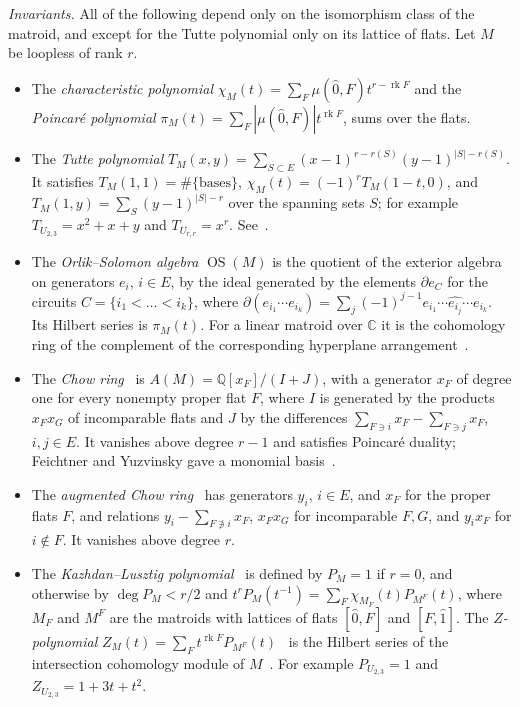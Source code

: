 \documentclass[11pt,a4paper]{article}
\numberwithin{equation}{section}
\theoremstyle{plain}
\theoremstyle{definition}
\theoremstyle{remark}
\newcommand{\Q}{\mathbb{Q}}
\newcommand{\C}{\mathbb{C}}
\DeclareMathOperator{\rk}{rk}
\DeclareMathOperator{\OS}{OS}
\begin{document}
\emph{Invariants.} All of the following depend only on the isomorphism class of the matroid, and except for the Tutte polynomial only on its lattice of flats. Let $M$ be loopless of rank $r$.
\begin{itemize}[leftmargin=1.5em]
\item The \emph{characteristic polynomial} $\chi_M(t)=\sum_F\mu(\hat0,F)t^{r-\rk F}$ and the \emph{Poincaré polynomial} $\pi_M(t)=\sum_F|\mu(\hat0,F)|t^{\rk F}$, sums over the flats.
\item The \emph{Tutte polynomial} $T_M(x,y)=\sum_{S\subset E}(x-1)^{r-r(S)}(y-1)^{|S|-r(S)}$. It satisfies $T_M(1,1)=\#\{\text{bases}\}$, $\chi_M(t)=(-1)^rT_M(1-t,0)$, and $T_M(1,y)=\sum_S(y-1)^{|S|-r}$ over the spanning sets $S$; for example $T_{U_{2,3}}=x^2+x+y$ and $T_{U_{r,r}}=x^r$. See~\cite{BO92}.
\item The \emph{Orlik--Solomon algebra} $\OS(M)$ is the quotient of the exterior algebra on generators $e_i$, $i\in E$, by the ideal generated by the elements $\partial e_C$ for the circuits $C=\{i_1<\dots<i_k\}$, where $\partial(e_{i_1}\cdots e_{i_k})=\sum_j(-1)^{j-1}e_{i_1}\cdots\widehat{e_{i_j}}\cdots e_{i_k}$. Its Hilbert series is $\pi_M(t)$. For a linear matroid over $\C$ it is the cohomology ring of the complement of the corresponding hyperplane arrangement~\cite{OT92}.
\item The \emph{Chow ring}~\cite{AHK18} is $A(M)=\Q[x_F]/(I+J)$, with a generator $x_F$ of degree one for every nonempty proper flat $F$, where $I$ is generated by the products $x_Fx_G$ of incomparable flats and $J$ by the differences $\sum_{F\ni i}x_F-\sum_{F\ni j}x_F$, $i,j\in E$. It vanishes above degree $r-1$ and satisfies Poincaré duality; Feichtner and Yuzvinsky gave a monomial basis~\cite{FY04}.
\item The \emph{augmented Chow ring}~\cite{BHMPW22} has generators $y_i$, $i\in E$, and $x_F$ for the proper flats $F$, and relations $y_i-\sum_{F\not\ni i}x_F$, $x_Fx_G$ for incomparable $F,G$, and $y_ix_F$ for $i\notin F$. It vanishes above degree $r$.
\item The \emph{Kazhdan--Lusztig polynomial}~\cite{EPW16} is defined by $P_M=1$ if $r=0$, and otherwise by $\deg P_M<r/2$ and $t^rP_M(t^{-1})=\sum_F\chi_{M_F}(t)P_{M^F}(t)$, where $M_F$ and $M^F$ are the matroids with lattices of flats $[\hat0,F]$ and $[F,\hat1]$. The \emph{$Z$-polynomial} $Z_M(t)=\sum_Ft^{\rk F}P_{M^F}(t)$~\cite{PXY18} is the Hilbert series of the intersection cohomology module of $M$~\cite{BHMPW26}. For example $P_{U_{2,3}}=1$ and $Z_{U_{2,3}}=1+3t+t^2$.
\end{itemize}
\end{document}

